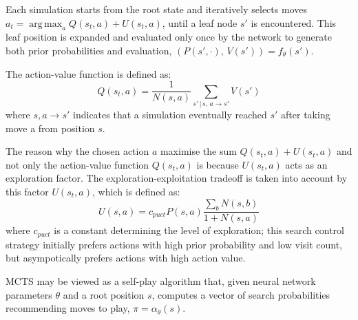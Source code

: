 \documentclass{article}
\DeclareMathOperator*{\argmax}{arg\,max}
\begin{document}
Each simulation starts from the root state and iteratively selects moves $a_t  = \argmax_a{Q(s_t,a) + U(s_t,a)}$, until a leaf node $s'$ is encountered. This leaf position is expanded and evaluated only once by the network to generate both prior probabilities and evaluation, $(P(s', \cdot), \, V(s')) = f_\theta(s')$.

The action-value function is defined as:
\begin{equation}
	Q(s_t, a) = \frac{1}{N(s,a)} \sum_{s'\, | \, s,\, a \rightarrow s'}{V(s')}
\end{equation}
where $s, a \rightarrow s'$ indicates that a simulation eventually reached $s'$ after taking move a from position $s$.

The reason why the chosen action $a$ maximise the sum $Q(s_t,a) + U(s_t,a)$ and not only the action-value function $Q(s_t, a)$ is because $U(s_t,a)$ acts as an exploration factor. The exploration-exploitation tradeoff is taken into account by this factor $U(s_t,a)$, which is defined as:
\begin{equation}
	U(s, a) = c_{puct}P(s, a)\frac{\sum_b N(s,b)}{1+N(s,a)}
\end{equation}
where $c_{puct}$ is a constant determining the level of exploration; this search control strategy initially prefers actions with high prior probability and low visit count, but asympotically prefers actions with high action value.

MCTS may be viewed as a self-play algorithm that, given neural network parameters $\theta$ and a root position $s$, computes a vector of search probabilities recommending moves to play, $\pi = \alpha_\theta(s)$.
\end{document}
